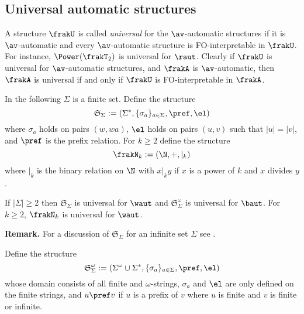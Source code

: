 

\subsection{Universal automatic structures}

A structure $\frakU$ is called {\em universal} for the $\av$-automatic structures
if it is $\av$-automatic and every $\av$-automatic structure is FO-interpretable in $\frakU$.
For instance, $\Power(\frakT_2)$ is universal for $\raut$. Clearly if $\frakU$ is universal for $\av$-automatic structures,
and $\frakA$ is $\av$-automatic, then  $\frakA$ is universal if and only if $\frakU$ is FO-interpretable in $\frakA$.

In the following $\Sigma$ is a finite set. Define the structure 
\[\mathfrak{S}_\Sigma := (\Sigma^\ast,\{\sigma_a\}_{a \in \Sigma},\pref,\el)\]
where $\sigma_a$ holds on pairs $(w,wa)$, $\el$ holds on pairs $(u,v)$ such that $|u|=|v|$, and $\pref$ is the prefix relation.
For $k \geq 2$ define the structure
\[
 \frakN_k := (\N,+,|_k)
\]
where $|_k$ is the binary relation on $\N$ with $x |_k y$ if $x$ is a power of $k$ and $x$ divides $y$.

\begin{proposition}
If $|\Sigma| \geq 2$ then $\mathfrak{S}_\Sigma$ is universal for $\waut$ and $\mathfrak{S}_{\Sigma}^\omega$ is universal for $\baut$.
 For $k \geq 2$, $\frakN_k$ is universal for $\waut$.
\end{proposition}

{\bf Remark.} For a discussion of $\mathfrak{S}_\Sigma$ for an infinite set $\Sigma$ see \cite{}.
 
Define the structure
\[
\mathfrak{S}_{\Sigma}^\omega := (\Sigma^{\omega} \cup \Sigma^\ast,\{\sigma_a\}_{a \in \Sigma},\pref,\el)
\]
whose domain consists of all finite and $\omega$-strings, $\sigma_a$ and $\el$ are only defined on the finite strings, 
and $u \pref v$ if $u$ is a prefix of $v$ where $u$ is finite and $v$ is finite or infinite.


